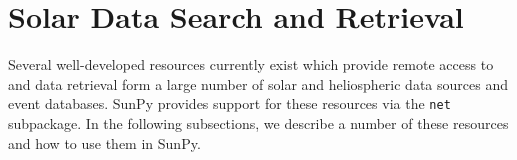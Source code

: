 \section{Solar Data Search and Retrieval}\label{sec:retrieval}

Several well-developed resources currently exist which provide remote access to 
and data retrieval form a large number of solar and heliospheric data sources 
and event databases. SunPy provides support for these resources via the 
\texttt{net} subpackage. In the following subsections, we describe a number of 
these resources and how to use them in SunPy.







